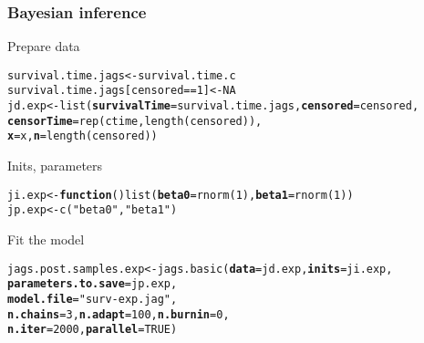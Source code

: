 \documentclass[color=usenames,dvipsnames]{beamer}\usepackage[]{graphicx}\usepackage[]{color}
\makeatletter
\newcommand{\hlnum}[1]{\textcolor[rgb]{0.69,0.494,0}{#1}}%
\newcommand{\hlstr}[1]{\textcolor[rgb]{0.749,0.012,0.012}{#1}}%
\newcommand{\hlopt}[1]{\textcolor[rgb]{0,0,0}{#1}}%
\newcommand{\hlstd}[1]{\textcolor[rgb]{0,0,0}{#1}}%
\newcommand{\hlkwa}[1]{\textcolor[rgb]{0,0,0}{\textbf{#1}}}%
\newcommand{\hlkwb}[1]{\textcolor[rgb]{0,0.341,0.682}{#1}}%
\newcommand{\hlkwc}[1]{\textcolor[rgb]{0,0,0}{\textbf{#1}}}%
\newcommand{\hlkwd}[1]{\textcolor[rgb]{0.004,0.004,0.506}{#1}}%
\newenvironment{kframe}{%
 \def\at@end@of@kframe{}%
 \ifinner\ifhmode%
  \def\at@end@of@kframe{\end{minipage}}%
  \begin{minipage}{\columnwidth}%
 \fi\fi%
 \def\FrameCommand##1{\hskip\@totalleftmargin \hskip-\fboxsep
 \colorbox{shadecolor}{##1}\hskip-\fboxsep
     \hskip-\linewidth \hskip-\@totalleftmargin \hskip\columnwidth}%
 \MakeFramed {\advance\hsize-\width
   \@totalleftmargin\z@ \linewidth\hsize
   \@setminipage}}%
 {\par\unskip\endMakeFramed%
 \at@end@of@kframe}
\newenvironment{knitrout}{}{} %
\makeatother
\begin{document}
\begin{frame}[fragile]
  \frametitle{Bayesian inference}
  Prepare data
\begin{knitrout}\scriptsize
{}\color{fgcolor}\begin{kframe}
\begin{alltt}
\hlstd{survival.time.jags} \hlkwb{<-} \hlstd{survival.time.c}
\hlstd{survival.time.jags[censored}\hlopt{==}\hlnum{1}\hlstd{]} \hlkwb{<-} \hlnum{NA}
\hlstd{jd.exp} \hlkwb{<-} \hlkwd{list}\hlstd{(}\hlkwc{survivalTime}\hlstd{=survival.time.jags,} \hlkwc{censored}\hlstd{=censored,}
               \hlkwc{censorTime}\hlstd{=}\hlkwd{rep}\hlstd{(ctime,} \hlkwd{length}\hlstd{(censored)),}
               \hlkwc{x}\hlstd{=x,} \hlkwc{n}\hlstd{=}\hlkwd{length}\hlstd{(censored))}
\end{alltt}
\end{kframe}
\end{knitrout}
\pause
\vfill
  Inits, parameters
\begin{knitrout}\scriptsize
{}\color{fgcolor}\begin{kframe}
\begin{alltt}
\hlstd{ji.exp} \hlkwb{<-} \hlkwa{function}\hlstd{()} \hlkwd{list}\hlstd{(}\hlkwc{beta0}\hlstd{=}\hlkwd{rnorm}\hlstd{(}\hlnum{1}\hlstd{),} \hlkwc{beta1}\hlstd{=}\hlkwd{rnorm}\hlstd{(}\hlnum{1}\hlstd{))}
\hlstd{jp.exp} \hlkwb{<-} \hlkwd{c}\hlstd{(}\hlstr{"beta0"}\hlstd{,} \hlstr{"beta1"}\hlstd{)}
\end{alltt}
\end{kframe}
\end{knitrout}
\pause
\vfill
  {\normalsize Fit the model}
\begin{knitrout}\scriptsize
{}\color{fgcolor}\begin{kframe}
\begin{alltt}
\hlstd{jags.post.samples.exp} \hlkwb{<-} \hlkwd{jags.basic}\hlstd{(}\hlkwc{data}\hlstd{=jd.exp,} \hlkwc{inits}\hlstd{=ji.exp,}
                                    \hlkwc{parameters.to.save}\hlstd{=jp.exp,}
                                    \hlkwc{model.file}\hlstd{=}\hlstr{"surv-exp.jag"}\hlstd{,}
                                    \hlkwc{n.chains}\hlstd{=}\hlnum{3}\hlstd{,} \hlkwc{n.adapt}\hlstd{=}\hlnum{100}\hlstd{,} \hlkwc{n.burnin}\hlstd{=}\hlnum{0}\hlstd{,}
                                    \hlkwc{n.iter}\hlstd{=}\hlnum{2000}\hlstd{,} \hlkwc{parallel}\hlstd{=}\hlnum{TRUE}\hlstd{)}
\end{alltt}
\end{kframe}
\end{knitrout}
\end{frame}
\end{document}
